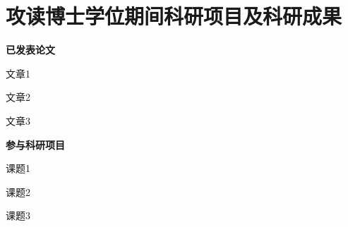 \chapter{攻读博士学位期间科研项目及科研成果}

\textbf{已发表论文}

\begin{enumerate}[label= {[\arabic*]}]
	\item 文章1
	\item 文章2
	\item 文章3
\end{enumerate}



\vspace*{0.5cm}

\textbf{参与科研项目}
\begin{enumerate}[label= {[\arabic*]}]
	\item 课题1
	
	\item 课题2
	
	\item 课题3
\end{enumerate}
